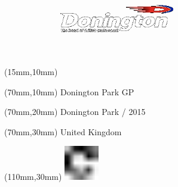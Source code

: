 \null\newpage
\begin{textblock*}{50mm}(15mm,10mm)%
\includegraphics[width=50mm]{LG/DON.png}
\end{textblock*}
\begin{textblock*}{130mm}(70mm,10mm)%
{\fontsize{20}{20}\selectfont Donington Park GP}\\
\end{textblock*}
\begin{textblock*}{120mm}(70mm,20mm)%
{\fontsize{16}{16}\selectfont Donington Park / 2015}\\
\end{textblock*}
\begin{textblock*}{120mm}(70mm,30mm)%
{\fontsize{12}{12}\selectfont United Kingdom}
\end{textblock*}
\begin{textblock*}{30mm}(110mm,30mm)%
\centering
\includegraphics[height=15mm]{icons/fa-rotate-right.pdf}
\end{textblock*}
